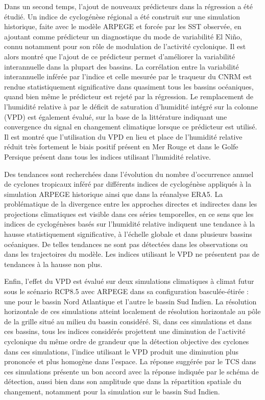 \documentclass[../main.tex]{subfiles}
\begin{document}
Dans un second temps, l'ajout de nouveaux prédicteurs dans la régression a été étudié. Un indice de cyclogénèse régional a été construit sur une simulation
historique, faite avec le modèle ARPEGE et forcée par les SST observée, en ajoutant comme prédicteur un diagnostique du mode de variabilité El Niño, connu
notamment pour son rôle de modulation de l'activité cyclonique. Il est alors montré que l'ajout de ce prédicteur permet d'améliorer la variabilité interannuelle
dans la plupart des bassins. La corrélation entre la variabilité interannuelle inférée par l'indice et celle mesurée par le traqueur du CNRM est rendue
statistiquement significative dans quasiment tous les bassins océaniques, quand bien même le prédicteur est rejeté par la régression. Le remplacement de
l'humidité relative à  par le déficit de saturation d'humidité intégré sur la colonne (VPD) est également évalué, sur la base de la littérature
indiquant une convergence du signal en changement climatique lorsque ce prédicteur est utilisé. Il est montré que l'utilisation du VPD en lieu et place de
l'humidité relative réduit très fortement le biais positif présent en Mer Rouge et dans le Golfe Persique présent dans tous les indices utilisant l'humidité
relative.

Des tendances sont recherchées dans l'évolution du nombre d'occurrence annuel de cyclones tropicaux inféré par différents indices de cyclogénèse appliqués à la
simulation ARPEGE historique ainsi que dans la réanalyse ERA5. La problématique de la divergence entre les approches directes et indirectes dans les projections
climatiques est visible dans ces séries temporelles, en ce sens que les indices de cyclogénèses basés sur l'humidité relative indiquent une tendance à la hausse
statistiquement significative, à l'échelle globale et dans plusieurs bassins océaniques. De telles tendances ne sont pas détectées dans les observations ou
dans les trajectoires du modèle. Les indices utilisant le VPD ne présentent pas de tendances à la hausse non plus.

Enfin, l'effet du VPD est évalué sur deux simulations climatiques à climat futur sous le scénario RCP8.5 avec ARPEGE dans sa configuration basculée-étirée : une
pour le bassin Nord Atlantique et l'autre le bassin Sud Indien. La résolution horizontale de ces simulations atteint localement  de résolution
horizontale au pôle de la grille situé au milieu du bassin considéré. Si, dans ces simulations et dans ces bassins, tous les indices considérés projettent une
diminution de l'activité cyclonique du même ordre de grandeur que la détection objective des cyclones dans ces simulations, l'indice utilisant le VPD produit
une diminution plus prononcée et plus homogène dans l'espace. La réponse suggérée par le TCS dans ces simulations présente un bon accord avec la réponse
indiquée par le schéma de détection, aussi bien dans son amplitude que dans la répartition spatiale du changement, notamment pour la simulation sur le bassin
Sud Indien.
\end{document}
